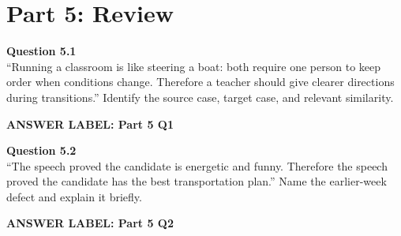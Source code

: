 \documentclass[12pt]{article}
\newcommand{\answerbox}[2]{%
\vspace{0.15em}
\noindent\textbf{#1}\par
\vspace{0.05em}
\noindent\fbox{%
\begin{minipage}[t][#2]{\dimexpr\textwidth-2\fboxsep-2\fboxrule}
\rule{\textwidth}{0pt}
\vspace{#2}
\end{minipage}
}\par
\vspace{0.25em}
}
\begin{document}
\newpage

\section*{Part 5: Review}

\textbf{Question 5.1}\\[-0.15em]
``Running a classroom is like steering a boat: both require one person to keep order when conditions change. Therefore a teacher should give clearer directions during transitions.'' Identify the source case, target case, and relevant similarity.

\answerbox{ANSWER LABEL: Part 5 Q1}{2.0in}

\textbf{Question 5.2}\\[-0.15em]
``The speech proved the candidate is energetic and funny. Therefore the speech proved the candidate has the best transportation plan.'' Name the earlier-week defect and explain it briefly.

\answerbox{ANSWER LABEL: Part 5 Q2}{2.0in}
\end{document}
